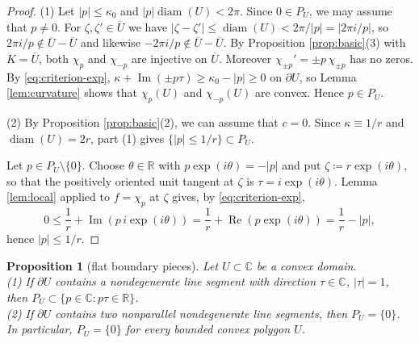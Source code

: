 \documentclass[a4paper, reqno, 11pt]{amsart}
\newtheorem{Prop}[Thm]{Proposition}
\theoremstyle{definition}
\begin{document}
\begin{proof}
(1) Let $|p| \le  \kappa_0$ and $|p| \operatorname{diam}(U) < 2\pi$.
Since $0 \in P_U$, we may assume that $p \ne 0$.
For $\zeta, \zeta' \in \overline{U}$ we have $|\zeta - \zeta'| \le  \operatorname{diam}(U) < 2\pi/|p| = |2\pi i/p|$, so $2\pi i/p \notin \overline{U} - \overline{U}$ and likewise $-2\pi i/p \notin \overline{U} - \overline{U}$.
By Proposition \ref{prop:basic}(3) with $K = \overline{U}$, both $\chi_p$ and $\chi_{-p}$ are injective on $\overline{U}$.
Moreover $\chi_{\pm p}' = \pm p \, \chi_{\pm p}$ has no zeros.
By \eqref{eq:criterion-exp}, $\kappa + \operatorname{Im}(\pm p\tau) \ge  \kappa_0 - |p| \ge  0$ on $\partial U$, so Lemma \ref{lem:curvature} shows that $\chi_p(U)$ and $\chi_{-p}(U)$ are convex.
Hence $p \in P_U$.

(2) By Proposition \ref{prop:basic}(2), we can assume that $c = 0$.
Since $\kappa \equiv 1/r$ and $\operatorname{diam}(U) = 2r$, part (1) gives $\{ |p| \le  1/r \} \subset P_U$. 

Let $p \in P_U \setminus \{0\}$.
Choose $\theta \in \mathbb{R}$ with $p \exp(i\theta) = -|p|$ and put $\zeta \coloneqq  r \exp(i\theta)$, so that the positively oriented unit tangent at $\zeta$ is $\tau = i \exp(i\theta)$.
Lemma \ref{lem:local} applied to $f = \chi_p$ at $\zeta$ gives, by \eqref{eq:criterion-exp},
\begin{equation*}
0 \le  \frac{1}{r} + \operatorname{Im}(p \, i \exp(i\theta)) = \frac{1}{r} + \operatorname{Re}(p \exp(i\theta)) = \frac{1}{r} - |p| ,
\end{equation*}
hence $|p| \le  1/r$.
\end{proof}

\begin{Prop}[flat boundary pieces]\label{prop:segment}
Let $U \subset \mathbb{C}$ be a convex domain. \\
(1) If $\partial U$ contains a nondegenerate line segment with direction $\tau \in \mathbb{C}$, $|\tau| = 1$, then $P_U \subset \{ p \in \mathbb{C} : p\tau \in \mathbb{R} \}$. \\
(2) If $\partial U$ contains two nonparallel nondegenerate line segments, then $P_U = \{0\}$. 
In particular, $P_U = \{0\}$ for every bounded convex polygon $U$.
\end{Prop}
\end{document}
